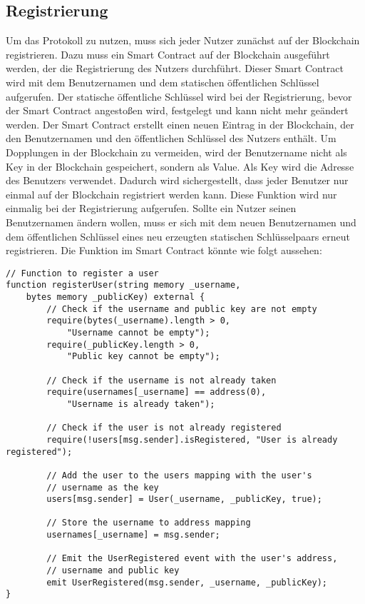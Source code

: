 \subsection{Registrierung}
\label{subsec:contract_registrierung}
Um das Protokoll zu nutzen, muss sich jeder Nutzer zunächst auf der Blockchain registrieren. Dazu muss ein Smart Contract auf der Blockchain ausgeführt werden, der die Registrierung des Nutzers durchführt. Dieser Smart Contract wird mit dem Benutzernamen und dem statischen öffentlichen Schlüssel aufgerufen. Der statische öffentliche Schlüssel wird bei der Registrierung, bevor der Smart Contract angestoßen wird, festgelegt und kann nicht mehr geändert werden. Der Smart Contract erstellt einen neuen Eintrag in der Blockchain, der den Benutzernamen und den öffentlichen Schlüssel des Nutzers enthält. Um Dopplungen in der Blockchain zu vermeiden, wird der Benutzername nicht als Key in der Blockchain gespeichert, sondern als Value. Als Key wird die Adresse des Benutzers verwendet. Dadurch wird sichergestellt, dass jeder Benutzer nur einmal auf der Blockchain registriert werden kann. Diese Funktion wird nur einmalig bei der Registrierung aufgerufen. Sollte ein Nutzer seinen Benutzernamen ändern wollen, muss er sich mit dem neuen Benutzernamen und dem öffentlichen Schlüssel eines neu erzeugten statischen Schlüsselpaars erneut registrieren. Die Funktion im Smart Contract könnte wie folgt aussehen:

\begin{lstlisting}[language=Solidity, caption={Registrierung eines Nutzers auf der Blockchain},captionpos=b]
// Function to register a user
function registerUser(string memory _username, 
    bytes memory _publicKey) external {
        // Check if the username and public key are not empty
        require(bytes(_username).length > 0, 
            "Username cannot be empty");
        require(_publicKey.length > 0, 
            "Public key cannot be empty");

        // Check if the username is not already taken
        require(usernames[_username] == address(0), 
            "Username is already taken");

        // Check if the user is not already registered
        require(!users[msg.sender].isRegistered, "User is already registered");

        // Add the user to the users mapping with the user's 
        // username as the key
        users[msg.sender] = User(_username, _publicKey, true);

        // Store the username to address mapping
        usernames[_username] = msg.sender;

        // Emit the UserRegistered event with the user's address, 
        // username and public key
        emit UserRegistered(msg.sender, _username, _publicKey);
}
\end{lstlisting}


